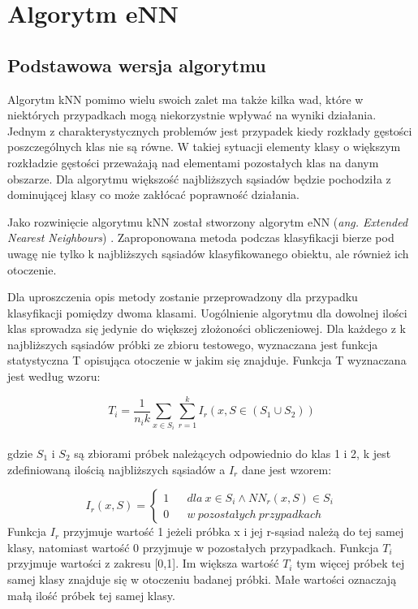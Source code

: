 \chapter{Algorytm eNN}
\label{chap:enn}
\section{Podstawowa wersja algorytmu}
Algorytm kNN pomimo wielu swoich zalet ma także kilka wad, które w niektórych przypadkach mogą niekorzystnie wpływać na wyniki działania. Jednym z charakterystycznych problemów jest przypadek kiedy rozkłady gęstości poszczególnych klas nie są równe. W takiej sytuacji elementy klasy o większym rozkładzie gęstości przeważają nad elementami pozostałych klas na danym obszarze. Dla algorytmu większość najbliższych sąsiadów będzie pochodziła z dominującej klasy co może zakłócać poprawność działania.

Jako rozwinięcie algorytmu kNN został stworzony algorytm eNN (\textit{ang. Extended Nearest Neighbours}) \cite{haibo-he}. Zaproponowana metoda podczas klasyfikacji bierze pod uwagę nie tylko k najbliższych sąsiadów klasyfikowanego obiektu, ale również ich otoczenie. 

Dla uproszczenia opis metody zostanie przeprowadzony dla przypadku klasyfikacji pomiędzy dwoma klasami. Uogólnienie algorytmu dla dowolnej ilości klas sprowadza się jedynie do większej złożoności obliczeniowej. Dla każdego z k najbliższych sąsiadów próbki ze zbioru testowego, wyznaczana jest funkcja statystyczna T opisująca otoczenie w jakim się znajduje. Funkcja T wyznaczana jest według wzoru:

\begin{equation}
T_{i} = \frac{1}{n_i k} {\sum_{x \in S_i} \sum_{r=1}^{k} I_r (x,S \in (S_1 \cup S_2))} 
\end{equation}\\
gdzie $S_1$ i $S_2$ są zbiorami próbek należących odpowiednio do klas 1 i 2, k jest zdefiniowaną ilością najbliższych sąsiadów a $I_r$ dane jest wzorem:

\begin{equation}
I_r(x,S) =\left\{\begin{matrix}
1 &&	dla\ x \in S_i \wedge NN_{r}(x,S) \in S_i
\\
0 &&	w\ pozostałych\ przypadkach
\end{matrix}\right.
\end{equation}
Funkcja $I_r$ przyjmuje wartość 1 jeżeli próbka x i jej r-sąsiad należą do tej samej klasy, natomiast wartość 0 przyjmuje w pozostałych przypadkach.
Funkcja $T_i$ przyjmuje wartości z zakresu [0,1]. Im większa wartość $T_i$ tym więcej próbek tej samej klasy znajduje się w otoczeniu badanej próbki. Małe wartości oznaczają małą ilość próbek tej samej klasy.

